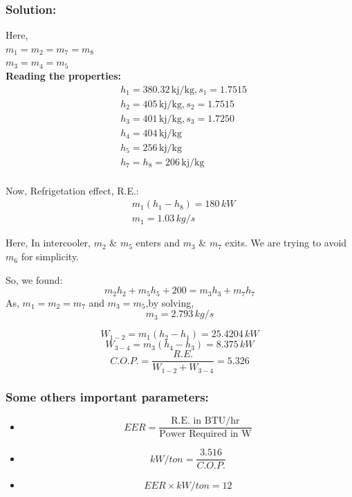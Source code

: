 \documentclass{article}
\begin{document}
\subsubsection*{Solution:}
\begin{multicols}{2}
  Here, \\
  $m_1 = m_2 = m_7 = m_8$ \\
$m_3 = m_4 = m_5$ \\

\textbf{Reading the properties:}
\begin{align*}
  &h_1 = 380.32 \, \text{kj/kg}, s_1 =  1.7515 \\
  &h_2 = 405 \, \text{kj/kg},  s_2 = 1.7515  \\
  &h_3 = 401 \, \text{kj/kg}, s_3 = 1.7250 \\
  &h_4 = 404 \, \text{kj/kg} \\
  &h_5 = 256 \, \text{kj/kg} \\
  &h_7 = h_8 = 206 \, \text{kj/kg} \\
\end{align*}

Now, Refrigetation effect, R.E.: 
\begin{align*}
  &m_1 (h_1-h_8) = 180 \, kW\\
  &m_1 = 1.03 \, kg/s 
\end{align*}

Here, In intercooler, $m_2$ \& $m_5$ enters and $m_3$ \& $m_7$ exits. We are trying to avoid $m_6$ for simplicity. 

So, we found: \\
$$m_2h_2 + m_5h_5 + 200 = m_3h_3 + m_7h_7$$
As, $m_1 = m_2 = m_7$ and $m_3 = m_5$,by solving,\\
$$m_3 = 2.793 \, kg/s$$

$$W_{1-2} = m_1 (h_2-h_1) = 25.4204 \, kW$$ 
$$W_{3-4} = m_3 (h_4-h_3) = 8.375 \, kW$$ 
$$C.O.P. = \frac{R.E.}{W_{1-2} + W_{3-4}} = 5.326 $$
  
\end{multicols}

\subsubsection*{Some others important parameters:}
\begin{itemize}
  \item $$EER = \frac{\text{R.E. in BTU/hr}}{\text{Power Required in W}}$$
  \item $$ kW/ton = \frac{3.516}{C.O.P.}$$
  \item $$ EER \times kW/ton = 12 $$
\end{itemize}
\end{document}
